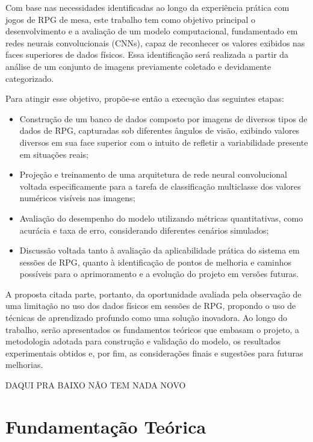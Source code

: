 Com base nas necessidades identificadas ao longo da experiência prática com jogos de RPG de mesa, este trabalho 
tem como objetivo principal o desenvolvimento e a avaliação de um modelo computacional, fundamentado em redes 
neurais convolucionais (CNNs), capaz de reconhecer os valores exibidos nas faces superiores de dados físicos. 
Essa identificação será realizada a partir da análise de um conjunto de imagens previamente coletado e 
devidamente categorizado.

Para atingir esse objetivo, propõe-se então a execução das seguintes etapas:

\begin{itemize}
\item Construção de um banco de dados composto por imagens de diversos tipos de dados de RPG, capturadas sob 
diferentes ângulos de visão, exibindo valores diversos em sua face superior com o intuito de refletir a 
variabilidade presente em situações reais;
\item Projeção e treinamento de uma arquitetura de rede neural convolucional voltada especificamente para a 
tarefa de classificação multiclasse dos valores numéricos visíveis nas imagens;
\item  Avaliação do desempenho do modelo utilizando métricas quantitativas, como acurácia e taxa de erro, 
considerando diferentes cenários simulados;
\item Discussão voltada tanto à avaliação da aplicabilidade prática do sistema em sessões de RPG, quanto à 
identificação de pontos de melhoria e caminhos possíveis para o aprimoramento e a evolução do projeto em 
versões futuras.
\end{itemize}

A proposta citada parte, portanto, da oportunidade avaliada pela observação de uma limitação no uso dos dados 
físicos em sessões de RPG, propondo o uso de técnicas de aprendizado profundo como uma solução inovadora. 
Ao longo do trabalho, serão apresentados os fundamentos teóricos que embasam o projeto, a metodologia adotada para 
construção e validação do modelo, os resultados experimentais obtidos e, por fim, as considerações finais e 
sugestões para futuras melhorias.


\vspace{1cm}
DAQUI PRA BAIXO NÃO TEM NADA NOVO


\section{Fundamentação Teórica}

